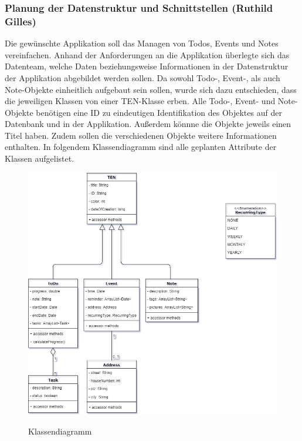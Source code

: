 \subsubsection{Planung der Datenstruktur und Schnittstellen (Ruthild Gilles)}

Die gewünschte Applikation soll das Managen von Todos, Events und Notes vereinfachen. Anhand der Anforderungen an die Applikation überlegte sich das Datenteam, welche Daten beziehungsweise Informationen in der Datenstruktur der Applikation abgebildet werden sollen. Da sowohl Todo-, Event-, als auch Note-Objekte einheitlich aufgebaut sein sollen, wurde sich dazu entschieden, dass die jeweiligen Klassen von einer TEN-Klasse erben. Alle Todo-, Event- und Note-Objekte benötigen eine ID zu eindeutigen Identifikation des Objektes auf der Datenbank und in der Applikation. Außerdem könnne die Objekte jeweils einen Titel haben. Zudem sollen die verschiedenen Objekte weitere Informationen enthalten. In folgendem Klassendiagramm sind alle geplanten Attribute der Klassen aufgelistet.

\begin{figure}[H]
\centering
\begin{minipage}[t]{1\textwidth} %
\caption{Klassendiagramm} %
\includegraphics[width=1\textwidth]{img/Klassendiagramm}\\ %
\end{minipage}
\end{figure}

